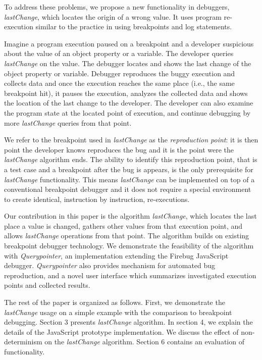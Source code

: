 \documentclass[preprint]{sigplanconf}
\begin{document}
To address these problems, we propose a new functionality in
debuggers, \textit{lastChange}, which locates the origin of a wrong
value. It uses program re-execution similar to the practice
in using breakpoints and log statements. 

Imagine a program execution paused on a breakpoint and a developer
suspicious about the value of an object property or a variable. The
developer queries \textit{lastChange} on the value. The debugger
locates and shows the last change of the object property or
variable. Debugger reproduces the buggy execution and collects data
and once the execution reaches the same place (i.e., the same
breakpoint hit), it pauses the execution, analyzes the collected data
and shows the location of the last change to the developer. The
developer can also examine the program state at the located point of
execution, and continue debugging by more \textit{lastChange} queries
from that point.

We refer to the breakpoint used in \textit{lastChange} as the
\textit{reproduction point}: it is then point the developer knows
reproduces the bug and it is the point were the \textit{lastChange}
algorithm ends. The ability to identify this reproduction point, that
is a test case and a breakpoint after the bug is appears, is the only
prerequisite for \textit{lastChange} functionality.  This means
\textit{lastChange} can be implemented on top of a conventional
breakpoint debugger and it does not require a special environment to
create identical, instruction by instruction, re-executions.

Our contribution in this paper is the algorithm \textit{lastChange},
which locates the last place a value is changed, gathers other values
from that execution point, and allows \textit{lastChange} operations
from that point. The algorithm builds on existing breakpoint debugger
technology. We demonstrate the feasibility of the algorithm with
\textit{Querypointer}, an implementation extending the Firebug
JavaScript debugger. \textit{Querypointer} also provides mechanism for
automated bug reproduction, and a novel user interface which
summarizes investigated execution points and collected results.

The rest of the paper is organized as follows. First, we demonstrate
the \textit{lastChange} usage on a simple example with the comparison
to breakpoint debugging. Section 3 presents \textit{lastChange}
algorithm. In section 4, we explain the details of the JavaScript
prototype implementation. We discuss the effect of non-determinism on
the \textit{lastChange} algorithm. Section 6 contains an evaluation of
 functionality.
\end{document}
